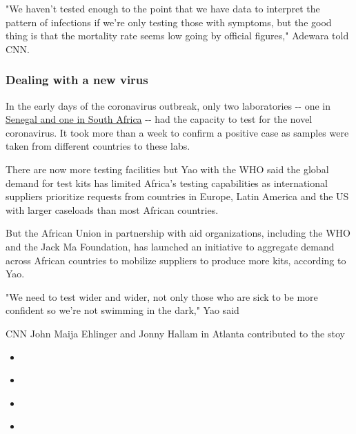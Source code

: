 "We haven't tested enough to the point that we have data to interpret
the pattern of infections if we're only testing those with symptoms, but
the good thing is that the mortality rate seems low going by official
figures," Adewara told CNN.

\hypertarget{dealing-with-a-new-virus}{%
\subsubsection{Dealing with a new
virus}\label{dealing-with-a-new-virus}}

In the early days of the coronavirus outbreak, only two laboratories
-\/- one in
\href{https://www.scmp.com/news/china/society/article/3051422/who-sends-coronavirus-test-kits-african-nations-after-first}{Senegal
and one in South Africa} -\/- had the capacity to test for the novel
coronavirus. It took more than a week to confirm a positive case as
samples were taken from different countries to these labs.

There are now more testing facilities but Yao with the WHO said the
global demand for test kits has limited Africa's testing capabilities as
international suppliers prioritize requests from countries in Europe,
Latin America and the US with larger caseloads than most African
countries.

But the African Union in partnership with aid organizations, including
the WHO and the Jack Ma Foundation, has launched an initiative to
aggregate demand across African countries to mobilize suppliers to
produce more kits, according to Yao.

"We need to test wider and wider, not only those who are sick to be more
confident so we're not swimming in the dark," Yao said

CNN John Maija Ehlinger and Jonny Hallam in Atlanta contributed to the
stoy

\begin{itemize}
\item
\end{itemize}

\begin{itemize}
\item
\end{itemize}

\begin{itemize}
\item
\end{itemize}

\begin{itemize}
\item
\end{itemize}

